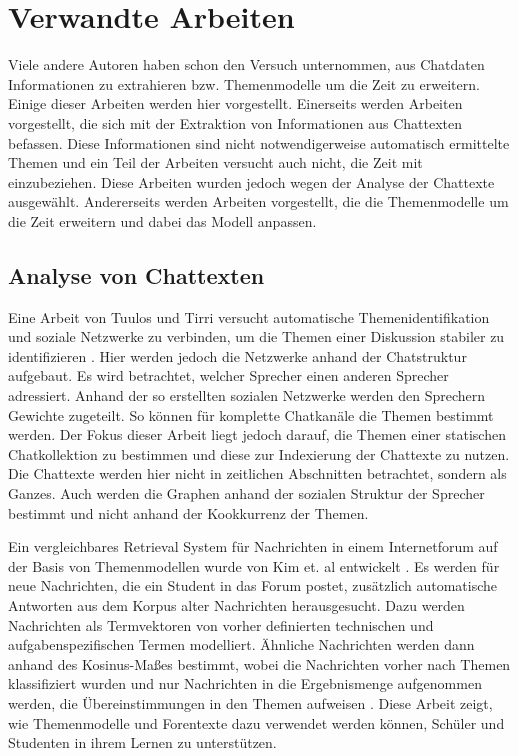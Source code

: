 \chapter{Verwandte Arbeiten}
\label{chap:relatedWork}

Viele andere Autoren haben schon den Versuch unternommen, aus Chatdaten Informationen zu extrahieren bzw. Themenmodelle um die Zeit zu erweitern. Einige dieser Arbeiten werden hier vorgestellt. Einerseits werden Arbeiten vorgestellt, die sich mit der Extraktion von Informationen aus Chattexten befassen. Diese Informationen sind nicht notwendigerweise automatisch ermittelte Themen und ein Teil der Arbeiten versucht auch nicht, die Zeit mit einzubeziehen. Diese Arbeiten wurden jedoch wegen der Analyse der Chattexte ausgewählt. Andererseits werden Arbeiten vorgestellt, die die Themenmodelle um die Zeit erweitern und dabei das Modell anpassen. 

\section{Analyse von Chattexten}

Eine Arbeit von Tuulos und Tirri versucht automatische Themen\-identifikation und soziale Netzwerke zu verbinden, um die Themen einer Diskussion stabiler zu identifizieren \citep{TMAndSocialNetworks}. Hier werden jedoch die Netzwerke anhand der Chatstruktur aufgebaut. Es wird betrachtet, welcher Sprecher einen anderen Sprecher adressiert. Anhand der so erstellten sozialen Netzwerke werden den Sprechern Gewichte zugeteilt. So können für komplette Chatkanäle die Themen bestimmt werden. Der Fokus dieser Arbeit liegt jedoch darauf, die Themen einer statischen Chatkollektion zu bestimmen und diese zur Indexierung der Chattexte zu nutzen. Die Chattexte werden hier nicht in zeitlichen Abschnitten betrachtet, sondern als Ganzes. Auch werden die Graphen anhand der sozialen Struktur der Sprecher bestimmt und nicht anhand der Kookkurrenz der Themen. 

Ein vergleichbares Retrieval System für Nachrichten in einem Internetforum auf der Basis von Themenmodellen wurde von Kim et. al entwickelt \citep{discussion_Kim2008Scaffolding}. Es werden für neue Nachrichten, die ein Student in das Forum postet, zusätzlich automatische Antworten aus dem Korpus alter Nachrichten herausgesucht. Dazu werden Nachrichten als Termvektoren von vorher definierten technischen und aufgabenspezifischen Termen modelliert. Ähnliche Nachrichten werden dann anhand des Kosinus-Maßes bestimmt, wobei die Nachrichten vorher nach Themen klassifiziert wurden und nur Nachrichten in die Ergebnismenge aufgenommen werden, die Übereinstimmungen in den Themen aufweisen \citep{discussion_Kim2006ontology}. Diese Arbeit zeigt, wie Themenmodelle und Forentexte dazu verwendet werden können, Schüler und Studenten in ihrem Lernen zu unterstützen.

